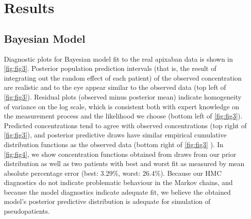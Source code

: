 \section{Results}
\subsection*{Bayesian Model}

Diagnostic plots for Bayesian model fit to the real apixaban data is shown in \cref{fig:fig3}.  Posterior population prediction intervals (that is, the result of integrating out the random effect of each patient) of the observed concentration are realistic and to the eye appear similar to the observed data (top left of \cref{fig:fig3}).  Residual plots (observed minus posterior mean) indicate homogeneity of variance on the log scale, which is consistent both with expert knowledge on the measurement process and the likelihood we choose (bottom left of \cref{fig:fig3}). Predicted concentrations tend to agree with observed concentrations (top right of \cref{fig:fig3}), and posterior predictive draws have similar empirical cumulative distribution functions as the observed data (bottom right of \cref{fig:fig3} ). In \cref{fig:fig4}, we show concentration functions obtained from draws from our prior distribution as well as two patients with best and worst fit as measured by mean absolute percentage error (best: 3.29\%, worst: 26.4\%). Because our HMC diagnostics do not indicate problematic behaviour in the Markov chains, and because the model diagnostics indicate adequate fit, we believe the obtained model’s posterior predictive distribution is adequate for simulation of pseudopatients.


